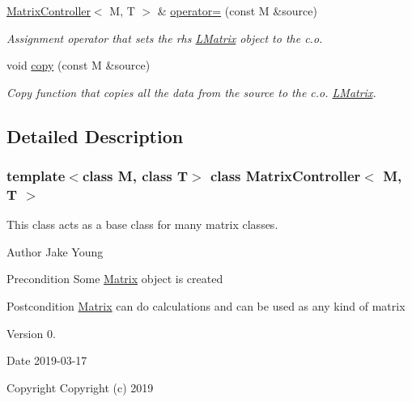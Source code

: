 \begin{DoxyCompactItemize}
\mbox{\hyperlink{class_matrix_controller}{Matrix\+Controller}}$<$ M, T $>$ \& \mbox{\hyperlink{class_matrix_controller_ad7a26021ed274944adbc4df6c068de35}{operator=}} (const M \&source)
\begin{DoxyCompactList}\small\item\em Assignment operator that sets the rhs \mbox{\hyperlink{class_l_matrix}{L\+Matrix}} object to the c.\+o. \end{DoxyCompactList}\item 
void \mbox{\hyperlink{class_matrix_controller_aced34d0065a5df3d3fadb140a782a22b}{copy}} (const M \&source)
\begin{DoxyCompactList}\small\item\em Copy function that copies all the data from the source to the c.\+o. \mbox{\hyperlink{class_l_matrix}{L\+Matrix}}. \end{DoxyCompactList}\end{DoxyCompactItemize}


\subsection{Detailed Description}
\subsubsection*{template$<$class M, class T$>$\newline
class Matrix\+Controller$<$ M, T $>$}

This class acts as a base class for many matrix classes. 

\begin{DoxyAuthor}{Author}
Jake Young 
\end{DoxyAuthor}
\begin{DoxyPrecond}{Precondition}
Some \mbox{\hyperlink{class_matrix}{Matrix}} object is created 
\end{DoxyPrecond}
\begin{DoxyPostcond}{Postcondition}
\mbox{\hyperlink{class_matrix}{Matrix}} can do calculations and can be used as any kind of matrix 
\end{DoxyPostcond}
\begin{DoxyVersion}{Version}
0. 
\end{DoxyVersion}
\begin{DoxyDate}{Date}
2019-\/03-\/17
\end{DoxyDate}
\begin{DoxyCopyright}{Copyright}
Copyright (c) 2019 
\end{DoxyCopyright}


